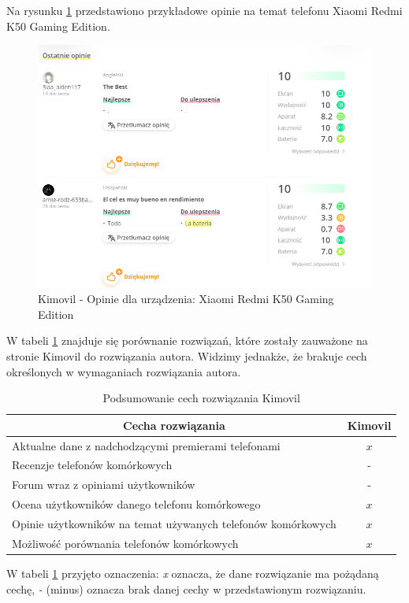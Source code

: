Na rysunku \ref*{kimovil_4} przedstawiono przykładowe opinie na temat telefonu Xiaomi Redmi K50 Gaming Edition.
\begin{figure}[H]
    \centering
    \includegraphics[scale=0.5]{img/Kimovil/opinieKimovil.png}
    \caption{Kimovil - Opinie dla urządzenia: Xiaomi Redmi K50 Gaming Edition}
    \label{kimovil_4}
\end{figure}
W tabeli \ref*{comparison_kimovil} znajduje się porównanie rozwiązań, które zostały zauważone na stronie Kimovil do rozwiązania autora. Widzimy jednakże, że brakuje cech określonych w wymaganiach rozwiązania autora.
\begin{table}[H]
    \centering
    \begin{tabular}{|l|c|}
        \hline
        \multicolumn{1}{|c|}{Cecha rozwiązania} & \multicolumn{1}{c|}{Kimovil} \\ \hline
        Aktualne dane z nadchodzącymi premierami telefonami & $x$  \\ \hline
        Recenzje telefonów komórkowych & - \\ \hline
        Forum wraz z opiniami użytkowników & - \\ \hline
        Ocena użytkowników danego telefonu komórkowego & $x$ \\ \hline
        Opinie użytkowników na temat używanych telefonów komórkowych & $x$ \\ \hline
        Możliwość porównania telefonów komórkowych & $x$ \\ \hline
    \end{tabular}
    \caption{Podsumowanie cech rozwiązania Kimovil}
    \label{comparison_kimovil}
\end{table}
W tabeli \ref*{comparison_kimovil} przyjęto oznaczenia: \textit{x} oznacza, że dane rozwiązanie ma pożądaną cechę, \textit{-} (minus) oznacza brak danej cechy w przedstawionym rozwiązaniu.

